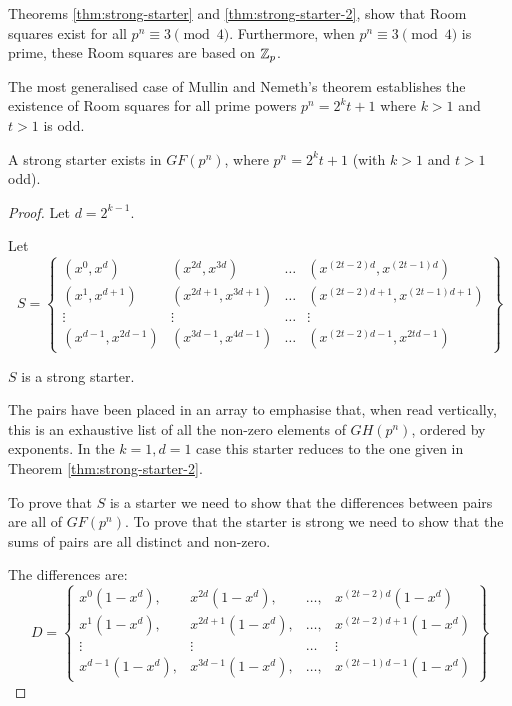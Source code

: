 Theorems
\ref{thm:strong-starter}
and
\ref{thm:strong-starter-2},
show that Room squares exist for all $p^n\equiv 3\pmod 4$.
Furthermore, when $p^n\equiv 3\pmod 4$ is prime, these Room squares are based on $\mathbb{Z}_{p}$.

The most generalised case of Mullin and Nemeth's theorem establishes the existence of Room squares for all prime powers $p^n = 2^{k}t + 1$ where $k > 1$ and $t > 1$ is odd.

\begin{theorem}
\label{thm:strong-starter-3}
A strong starter exists in $GF(p^n)$, where $p^n = 2^{k}t + 1$ (with $k > 1$ and $t > 1$ odd).
\end{theorem}

\begin{proof}
Let $d = 2^{k - 1}$.

Let
\begin{equation*}
S = \left\{
  \begin{array}{cccc}
    (x^0,x^d) & (x^{2d},x^{3d}) & \ldots & (x^{(2t - 2)d},x^{(2t - 1)d}) \\
    (x^1,x^{d + 1}) & (x^{2d + 1},x^{3d + 1}) & \ldots & (x^{(2t - 2){d + 1}},x^{(2t - 1){d + 1}}) \\
    \vdots & \vdots & \ldots & \vdots \\
    (x^{d - 1},x^{2d - 1}) & (x^{3d - 1},x^{4d - 1}) & \ldots & (x^{(2t - 2){d - 1}},x^{2td - 1})
  \end{array}
\right\}
\end{equation*}

$S$ is a strong starter.

The pairs have been placed in an array to emphasise that, when read vertically, this is an exhaustive list of all the non-zero elements of $GH(p^{n})$, ordered by exponents.
In the $k = 1, d = 1$ case this starter reduces to the one given in Theorem \ref{thm:strong-starter-2}.

To prove that $S$ is a starter we need to show that the differences between pairs are all of $GF(p^n)$.
To prove that the starter is strong we need to show that the sums of pairs are all distinct and non-zero.

The differences are:
\begin{equation*}
  D = \left\{
  \begin{array}{cccc}
    x^0(1 - x^d), & x^{2d}(1 - x^d), & \ldots, & x^{(2t - 2)d}(1 - x^d) \\
    x^1(1 - x^d), & x^{2d + 1}(1 - x^d), & \ldots, & x^{(2t - 2)d + 1}(1 - x^d) \\
    \vdots & \vdots & \ldots & \vdots \\
    x^{d - 1}(1 - x^d), & x^{3d - 1}(1 - x^d), & \ldots, & x^{(2t - 1)d - 1}(1 - x^d)
  \end{array}
  \right\}
\end{equation*}


\end{proof}

